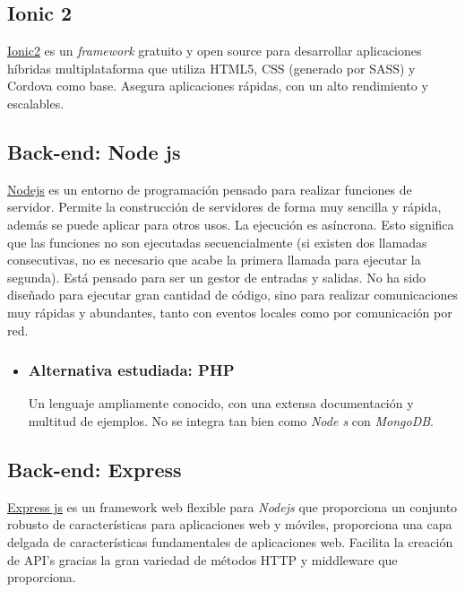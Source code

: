 \subsection{ Ionic 2}\label{tecnologias_ionic2}
\hyperlink{https://ionicframework.com/}{Ionic2} es un \emph{framework} gratuito y open source para desarrollar aplicaciones híbridas multiplataforma que utiliza HTML5, CSS (generado por SASS) y Cordova como base. Asegura aplicaciones rápidas, con un alto rendimiento y escalables.


\subsection{Back-end: Node js}\label{tecnologias_nodejs}
\hyperlink{https://nodejs.org/}{Nodejs} es un entorno de programación pensado para realizar funciones de servidor. Permite la construcción de servidores de forma muy sencilla y rápida, además se puede aplicar para otros usos. La ejecución es asíncrona. Esto significa que las funciones no son ejecutadas secuencialmente (si existen dos llamadas consecutivas, no es necesario que acabe la primera llamada para ejecutar la segunda).
Está pensado para ser un gestor de entradas y salidas. No ha sido diseñado para ejecutar gran cantidad de código, sino para realizar comunicaciones muy rápidas y abundantes, tanto con eventos locales como por comunicación por red.

\begin{itemize}
	\item \subsubsection{Alternativa estudiada: PHP}\label{php}
	Un lenguaje ampliamente conocido, con una extensa documentación y multitud de ejemplos. No se integra tan bien como \emph{Node s} con \emph{MongoDB}. 
\end{itemize}


\subsection{Back-end: Express }\label{tecnologias_expressjs}
\hyperlink{http://expressjs.com/}{Express js} es un framework web flexible para \emph{Nodejs} que proporciona un conjunto robusto de características para aplicaciones web y móviles, proporciona una capa delgada de características fundamentales de aplicaciones web. Facilita la creación de API’s gracias la gran variedad de métodos HTTP y middleware que proporciona.


